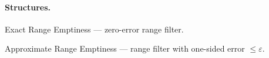 \paragraph{Structures.}
\begin{description}[style=nextline, leftmargin=4cm, labelwidth=3.4cm]
  \item[ERE] Exact Range Emptiness --- zero-error range filter.
  \item[ARE] Approximate Range Emptiness --- range filter with one-sided error $\leq \varepsilon$.
\end{description}
